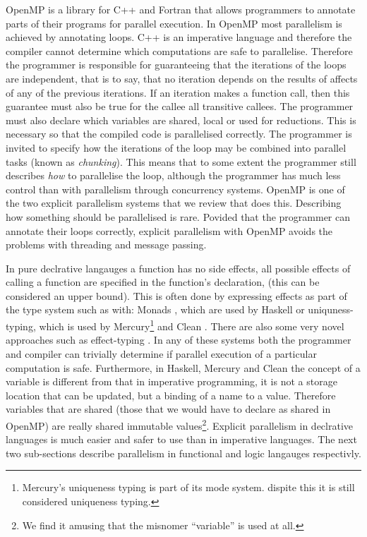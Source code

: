 OpenMP \citep{openmp} is a library for C++ \citep{cplusplus} and Fortran
that allows programmers to annotate parts of their programs for parallel
execution.
In OpenMP most parallelism is achieved by annotating loops.
C++ is an imperative language and therefore the compiler cannot determine
which computations are safe to parallelise.
Therefore the programmer is responsible for guaranteeing that the iterations
of the loops are independent,
that is to say, that no iteration depends on the results of affects of any of
the previous iterations.
If an iteration makes a function call, then this guarantee must also be true for
the callee all transitive callees.
The programmer must also declare which variables are shared, local or used
for reductions.
This is necessary so that the compiled code is parallelised correctly.
The programmer is invited to specify how the iterations of the loop may be
combined into parallel tasks (known as \emph{chunking}).
This means that to some extent the programmer still describes \emph{how} to
parallelise the loop,
although the programmer has much less control than with parallelism through
concurrency systems.
OpenMP is one of the two explicit parallelism systems that we review that
does this.
Describing how something should be parallelised is rare.
Povided that the programmer can annotate their loops correctly,
explicit parallelism with OpenMP avoids the problems
with threading and message passing.  

In pure declrative langauges
a function has no side effects,
all possible effects of calling a function are specified in the function's
declaration, (this can be considered an upper bound).
This is often done by expressing effects as part of the type system such as
with:
Monads \citep{haskell-monads}, which are used by Haskell \citep{haskell98}
or
uniquness-typing, which is used by 
Mercury\footnote{
    Mercury's uniqueness typing is part of its mode system.
    dispite this it is still considered uniqueness typing.}
\citep{mercury_jlp}
and Clean \citep{brus:1987:clean}.
There are also some very novel approaches such as effect-typing \citep{ddc}.
In any of these systems both the programmer and compiler can trivially
determine if parallel execution of a particular computation is safe.
Furthermore,
in Haskell, Mercury and Clean
the concept of a variable is different from that in imperative programming,
it is not a storage location that can be updated,
but a binding of a name to a value.
Therefore variables that are shared
(those that we would have to declare as shared in OpenMP)
are really shared immutable values\footnote{
    We find it amusing that the misnomer ``variable'' is used at all.}.
Explicit parallelism in declrative languages is much easier and safer to use
than in imperative languages.
The next two sub-sections describe parallelism in functional and logic
langauges respectivly.

